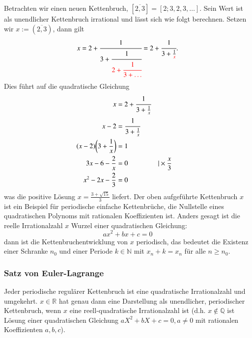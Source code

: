 \begin{beispiel}
Betrachten wir einen neuen Kettenbruch, $[\overline{2,3}] =  [2;3,2,3,\dots]$.
Sein Wert ist als unendlicher Kettenbruch irrational und lässt sich
wie folgt berechnen. Setzen wir $x:=(\overline{2,3})$, dann gilt
\begin{equation}
x
=
2 + \cfrac{1}{3+\cfrac{1}{\color{red}2+\cfrac{1}{3+\dots}}}
=
2 + \cfrac{1}{3+\frac{1}{\color{red}x}}.
\end{equation}
Dies führt auf die quadratische Gleichung 
\begin{align*}
x &= 2 + \cfrac{1}{3+\frac{1}{x}}
\\
x - 2 &= \cfrac{1}{3+\frac{1}{x}}
\\
(x - 2)\biggl(3 + \frac{1}{x}\biggr) &= 1
\\
3x - 6 - \frac{2}{x} &= 0 &&\vert \times\frac{x}{3}
\\
x^2 - 2x - \frac{2}{3} &= 0
\end{align*}
was die positive Lösung $x = \frac{3+\sqrt{15}}{3}$ liefert.
Der oben aufgeführte Kettenbruch $x$ ist ein Beispiel für periodische
einfache Kettenbrüche, die Nullstelle eines quadratischen Polynoms
mit rationalen Koeffizienten ist. Anders gesagt ist die reelle
Irrationalzahl $x$ Wurzel einer quadratischen Gleichung:
\begin{equation}
ax^2 + bx + c = 0
\end{equation}
dann ist die Kettenbruchentwicklung von $x$ periodisch, das bedeutet
die Existenz einer Schranke $n_0$ und einer Periode $k \in \mathbb{N}$
mit $x_n+k = x_n$ für alle $n\ge n_0$.
\end{beispiel}
\subsubsection{Satz von Euler-Lagrange}
Jeder periodische regulärer Kettenbruch ist eine quadratische
Irrationalzahl und umgekehrt. $x \in \mathbb{R}$ hat genau dann eine 
Darstellung als unendlicher, periodischer Kettenbruch, wenn $x$ eine
reell-quadratische Irrationalzahl ist (d.h. $x \notin \mathbb{Q}$ ist Lösung
einer quadratischen Gleichung $aX^2 + bX + c = 0, a \neq 0$ mit rationalen 
Koeffizienten $a,b,c$).

